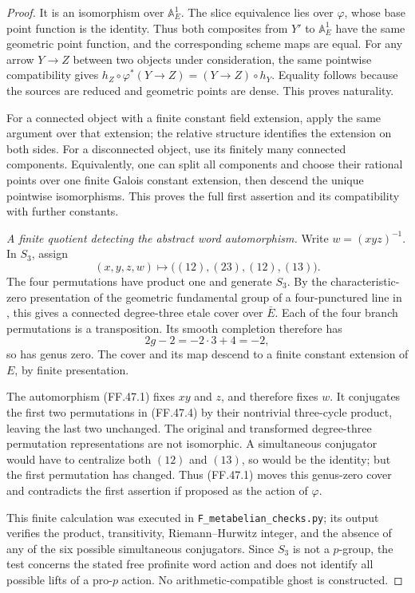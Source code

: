 \begin{proof}
It is an isomorphism over \(\mathbb A^1_E\).
The slice equivalence lies over \(\varphi\), whose
base point function is the identity. Thus both composites
from \(Y'\) to \(\mathbb A^1_E\) have the same
geometric point function, and the corresponding scheme
maps are equal. For any arrow \(Y\to Z\) between
two objects under consideration, the same pointwise
compatibility gives
\(h_Z\circ\varphi^*(Y\to Z)=(Y\to Z)\circ h_Y\).
Equality follows because the sources are reduced and
geometric points are dense. This proves naturality.

For a connected object with a finite constant field
extension, apply the same argument over that extension;
the relative structure identifies the extension on both
sides. For a disconnected object, use its finitely many
connected components. Equivalently, one can split all
components and choose their rational points over one
finite Galois constant extension, then descend the unique
pointwise isomorphisms. This proves the full first
assertion and its compatibility with further constants.

\emph{A finite quotient detecting the abstract word automorphism.}
Write \(w=(xyz)^{-1}\). In \(S_3\), assign
\[
           (x,y,z,w)\longmapsto
           \big((12),(23),(12),(13)\big).
                                                        \tag{FF.47.4}
\]
The four permutations have product one and generate
\(S_3\). By the characteristic-zero presentation of the
geometric fundamental group of a four-punctured line
in \citet[Expos\'e~XIII, Corollary~2.12]{FF_SGA1},
this gives a connected degree-three etale cover over
\(\bar E\). Each of the four branch permutations
is a transposition. Its smooth completion therefore has
\[
                         2g-2=-2\cdot3+4=-2,
\]
so has genus zero. The cover and its map descend to a
finite constant extension of \(E\), by finite
presentation.

The automorphism (FF.47.1) fixes \(xy\) and \(z\),
and therefore fixes \(w\). It conjugates the first
two permutations in (FF.47.4) by their nontrivial
three-cycle product, leaving the last two unchanged.
The original and transformed degree-three permutation
representations are not isomorphic. A simultaneous
conjugator would have to centralize both \((12)\) and
\((13)\), so would be the identity; but the first
permutation has changed. Thus (FF.47.1) moves this
genus-zero cover and contradicts the first assertion
if proposed as the action of \(\varphi\).

This finite calculation was executed in
\texttt{F\_metabelian\_checks.py}; its output verifies
the product, transitivity, Riemann--Hurwitz integer, and
the absence of any of the six possible simultaneous
conjugators. Since \(S_3\) is not a \(p\)-group,
the test concerns the stated free profinite word action
and does not identify all possible lifts of a pro-\(p\)
action. No arithmetic-compatible ghost is constructed.
\end{proof}

